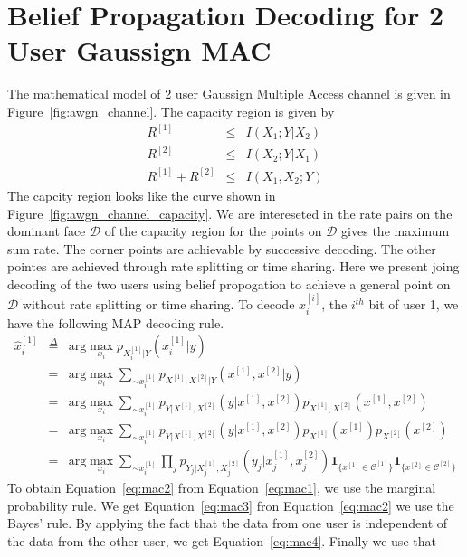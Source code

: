  \section{Belief Propagation Decoding for 2 User Gaussign MAC}
 The mathematical model of 2 user Gaussign Multiple Access channel is given in Figure~\ref{fig:awgn_channel}. The capacity region is given by
 \begin{eqnarray}
  R^{[1]} &\leq& I(X_1;Y|X_2) \nonumber \\
  R^{[2]} &\leq& I(X_2;Y|X_1) \nonumber \\
  R^{[1]} + R^{[2]} &\leq& I(X_1, X_2;Y) \nonumber
 \end{eqnarray}
The capcity region looks like the curve shown in Figure~\ref{fig:awgn_channel_capacity}. We are intereseted in the rate pairs on the 
dominant face $\mathcal{D}$ of the capacity region for the points on $\mathcal{D}$ gives the maximum sum rate. The corner points are
achievable by successive decoding. The other pointes are achieved through rate splitting or time sharing. Here we present joing decoding
of the two users using belief propogation to achieve a general point on $\mathcal{D}$ without rate splitting or time sharing.
To decode $x_i^{[i]}$, the $i^{th}$ bit of user 1, we have the following MAP decoding rule.
 \begin{eqnarray}
  \hat{x}_i^{[1]} 	&\overset{\Delta}{=}& \text{arg} \max_{x_i}p_{X_i^{[1]}|Y}(x_i^{[1]}|y) \label{eq:mac1} \\
 			&=& \text{arg} \max_{x_i}\sum_{\sim x_i^{[1]}} p_{X^{[1]}, X^{[2]}|Y} (x^{[1]}, x^{[2]}|y)  \label{eq:mac2}\\
 			&=& \text{arg} \max_{x_i}\sum_{\sim x_i^{[1]}} p_{Y|X^{[1]}, X^{[2]}} (y|x^{[1]}, x^{[2]}) p_{X^{[1]}, X^{[2]}}(x^{[1]}, x^{[2]}) \label{eq:mac3}\\
 			&=& \text{arg} \max_{x_i}\sum_{\sim x_i^{[1]}} p_{Y|X^{[1]}, X^{[2]}} (y|x^{[1]}, x^{[2]}) p_{X^{[1]}}(x^{[1]}) p_{X^{[2]}}(x^{[2]}) \label{eq:mac4}\\
 			&=& \text{arg} \max_{x_i}\sum_{\sim x_i^{[1]}} \prod_j p_{Y_j|X_j^{[1]}, X_j^{[2]}} (y_j|x_j^{[1]}, x_j^{[2]}) \mathbf{1}_{\lbrace x^{[1]} \in \mathcal{C}^{[1]}\rbrace} \mathbf{1}_{\lbrace x^{[2]} \in \mathcal{C}^{[2]}\rbrace} \label{eq:mac5}
 \end{eqnarray}
To obtain Equation~\ref{eq:mac2} from Equation~\ref{eq:mac1}, we use the marginal probability rule. We get Equation~\ref{eq:mac3} fron Equation~\ref{eq:mac2} we use
the Bayes' rule. By applying the fact that the data from one user is independent of the data from the other user, we get Equation~\ref{eq:mac4}. Finally we use that
